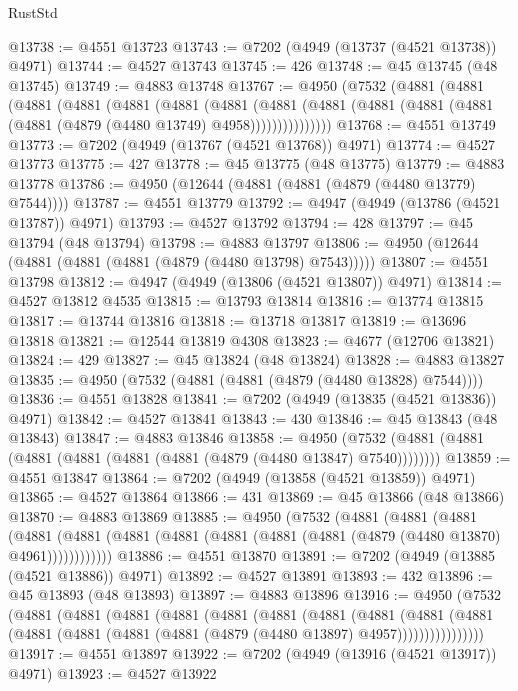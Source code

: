 \begin{lexlean}{RustStd}
\begin{coremodule}
@13738 := @4551 @13723
@13743 := @7202 (@4949 (@13737 (@4521 @13738)) @4971)
@13744 := @4527 @13743
@13745 := 426
@13748 := @45 @13745 (@48 @13745)
@13749 := @4883 @13748
@13767 := @4950
    (@7532
      (@4881
        (@4881
          (@4881
            (@4881
              (@4881
                (@4881
                  (@4881
                    (@4881
                      (@4881 (@4881 (@4881 (@4881 (@4881 (@4879 (@4480 @13749) @4958)))))))))))))))
@13768 := @4551 @13749
@13773 := @7202 (@4949 (@13767 (@4521 @13768)) @4971)
@13774 := @4527 @13773
@13775 := 427
@13778 := @45 @13775 (@48 @13775)
@13779 := @4883 @13778
@13786 := @4950 (@12644 (@4881 (@4881 (@4879 (@4480 @13779) @7544))))
@13787 := @4551 @13779
@13792 := @4947 (@4949 (@13786 (@4521 @13787)) @4971)
@13793 := @4527 @13792
@13794 := 428
@13797 := @45 @13794 (@48 @13794)
@13798 := @4883 @13797
@13806 := @4950 (@12644 (@4881 (@4881 (@4881 (@4879 (@4480 @13798) @7543)))))
@13807 := @4551 @13798
@13812 := @4947 (@4949 (@13806 (@4521 @13807)) @4971)
@13814 := @4527 @13812 @4535
@13815 := @13793 @13814
@13816 := @13774 @13815
@13817 := @13744 @13816
@13818 := @13718 @13817
@13819 := @13696 @13818
@13821 := @12544 @13819 @4308
@13823 := @4677 (@12706 @13821)
@13824 := 429
@13827 := @45 @13824 (@48 @13824)
@13828 := @4883 @13827
@13835 := @4950 (@7532 (@4881 (@4881 (@4879 (@4480 @13828) @7544))))
@13836 := @4551 @13828
@13841 := @7202 (@4949 (@13835 (@4521 @13836)) @4971)
@13842 := @4527 @13841
@13843 := 430
@13846 := @45 @13843 (@48 @13843)
@13847 := @4883 @13846
@13858 := @4950 (@7532 (@4881 (@4881 (@4881 (@4881 (@4881 (@4881 (@4879 (@4480 @13847) @7540))))))))
@13859 := @4551 @13847
@13864 := @7202 (@4949 (@13858 (@4521 @13859)) @4971)
@13865 := @4527 @13864
@13866 := 431
@13869 := @45 @13866 (@48 @13866)
@13870 := @4883 @13869
@13885 := @4950
    (@7532
      (@4881
        (@4881
          (@4881
            (@4881 (@4881 (@4881 (@4881 (@4881 (@4881 (@4881 (@4879 (@4480 @13870) @4961))))))))))))
@13886 := @4551 @13870
@13891 := @7202 (@4949 (@13885 (@4521 @13886)) @4971)
@13892 := @4527 @13891
@13893 := 432
@13896 := @45 @13893 (@48 @13893)
@13897 := @4883 @13896
@13916 := @4950
    (@7532
      (@4881
        (@4881
          (@4881
            (@4881
              (@4881
                (@4881
                  (@4881
                    (@4881
                      (@4881
                        (@4881
                          (@4881 (@4881 (@4881 (@4881 (@4879 (@4480 @13897) @4957))))))))))))))))
@13917 := @4551 @13897
@13922 := @7202 (@4949 (@13916 (@4521 @13917)) @4971)
@13923 := @4527 @13922

\end{coremodule}
\end{lexlean}
